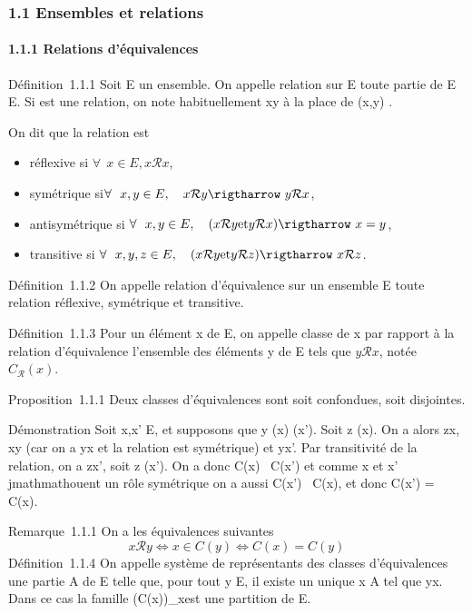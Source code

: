 

\subsubsection{1.1 Ensembles et relations}

\paragraph{1.1.1 Relations d'équivalences}

Définition~1.1.1 Soit E un ensemble. On appelle relation sur E toute
partie de E \times E. Si  est une relation, on note habituellement xy à la
place de (x,y) \in{}.

On dit que la relation est

\begin{itemize}
\itemsep1pt\parskip0pt
\item
  réflexive si $\forall~~x \in E, x\mathcal{R}x$,
\item
  symétrique si$ \forall~~x,y \in E,\quad
  x\mathcal{R}y \rigtharrow~ y\mathcal{R}x$,
\item
  antisymétrique si $\forall~~x,y \in
  E,\quad (x\mathcal{R}y\text{et} y\mathcal{R}x) \rigtharrow~ x = y$,
\item
  transitive si $\forall~~x,y,z \in
  E,\quad (x\mathcal{R}y\text{et} y\mathcal{R}z) \rigtharrow~ x\mathcal{R}z$.
\end{itemize}

Définition~1.1.2 On appelle relation d'équivalence sur un ensemble E
toute relation réflexive, symétrique et transitive.

Définition~1.1.3 Pour un élément x de E, on appelle classe de x par
rapport à la relation d'équivalence  l'ensemble des éléments y de E
tels que $y\mathcal{R}x$, notée $C_{\mathcal{R}}(x)$.

Proposition~1.1.1 Deux classes d'équivalences sont soit confondues, soit
disjointes.

Démonstration Soit x,x' \in E, et supposons que y \inC(x) \bigcapC(x'). Soit z
\inC(x). On a alors zx, xy (car on a yx et la relation est symétrique)
et yx'. Par transitivité de la relation, on a zx', soit z \inC(x'). On a
donc C(x) \subset~C(x') et comme x et x' \\jmathmathouent un rôle symétrique on a aussi
C(x') \subset~C(x), et donc C(x') = C(x).

Remarque~1.1.1 On a les équivalences suivantes
\[
x \mathcal{R} y \Leftrightarrow x \in C(y) \mathrel\Leftrightarrow
C(x) = C(y)
\]
Définition~1.1.4 On appelle système de représentants des classes
d'équivalences une partie A de E telle que, pour tout y \in E, il existe
un unique x \in A tel que yx. Dans ce cas la famille
\left (C(x)\right )_x\inA est une
partition de E.

